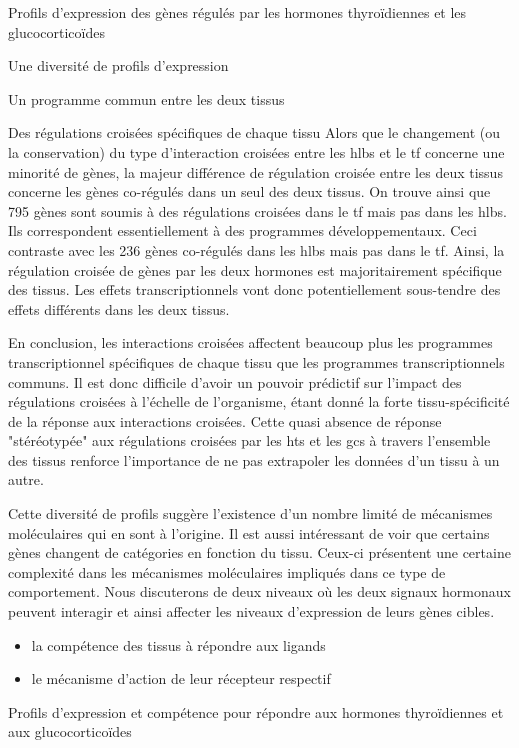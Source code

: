 \documentclass[../main.tex]{subfiles}
\begin{document}
\begin{chapter}{Profils d'expression des gènes régulés par les hormones thyroïdiennes et les glucocorticoïdes}
\begin{section}{Une diversité de profils d'expression}
\begin{subsection}{Un programme commun entre les deux tissus}
\begin{subsubsection}{Des régulations croisées spécifiques de chaque tissu}
Alors que le changement (ou la conservation) du type d'interaction croisées entre les \glspl{hlb} et le \gls{tf} concerne une minorité de gènes, la majeur différence de régulation croisée entre les deux tissus concerne les gènes co-régulés dans un seul des deux tissus.
On trouve ainsi que 795 gènes sont soumis à des régulations croisées dans le \gls{tf} mais pas dans les \glspl{hlb}.
Ils correspondent essentiellement à des programmes développementaux.
Ceci contraste avec les 236 gènes co-régulés dans les \glspl{hlb} mais pas dans le \gls{tf}.
Ainsi, la régulation croisée de gènes par les deux hormones est majoritairement spécifique des tissus.
Les effets transcriptionnels vont donc potentiellement sous-tendre des effets différents dans les deux tissus.
\end{subsubsection}

En conclusion, les interactions croisées affectent beaucoup plus les programmes transcriptionnel spécifiques de chaque tissu que les programmes transcriptionnels communs.
Il est donc difficile d'avoir un pouvoir prédictif sur l'impact des régulations croisées à l'échelle de l'organisme, étant donné la forte tissu-spécificité de la réponse aux interactions croisées.
Cette quasi absence de réponse "stéréotypée" aux régulations croisées par les \glspl{ht} et les \glspl{gc} à travers l'ensemble des tissus renforce l'importance de ne pas extrapoler les données d'un tissu à un autre.
\par
Cette diversité de profils suggère l'existence d'un nombre limité de mécanismes moléculaires qui en sont à l'origine.
Il est aussi intéressant de voir que certains gènes changent de catégories en fonction du tissu.
Ceux-ci présentent une certaine complexité dans les mécanismes moléculaires impliqués dans ce type de comportement.
Nous discuterons de deux niveaux où les deux signaux hormonaux peuvent interagir et ainsi affecter les niveaux d'expression de leurs gènes cibles.
\begin{itemize}
\item la compétence des tissus à répondre aux ligands
\item le mécanisme d'action de leur récepteur respectif
\end{itemize}
\end{subsection}


\begin{subsection}{Profils d'expression et compétence pour répondre aux hormones thyroïdiennes et aux glucocorticoïdes}


\end{subsection}
\end{section}
\end{chapter}
\end{document}
